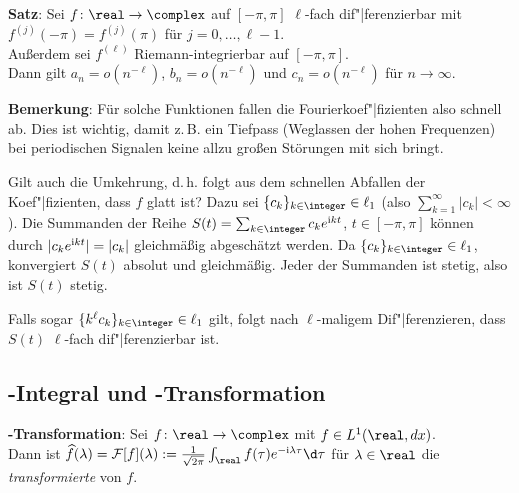 \linie

\textbf{Satz}:
Sei $f\colon \real \rightarrow \complex$ auf $[-\pi, \pi]$
$\ell$-fach dif"|ferenzierbar mit
$f^{(j)}(-\pi) = f^{(j)}(\pi)$ für $j = 0, \dotsc, \ell - 1$.\\
Außerdem sei $f^{(\ell)}$ Riemann-integrierbar auf $[-\pi, \pi]$.\\
Dann gilt $a_n = o(n^{-\ell})$,
$b_n = o(n^{-\ell})$ und
$c_n = o(n^{-\ell})$ für $n \to \infty$.

\textbf{Bemerkung}:
Für solche Funktionen fallen die Fourierkoef"|fizienten also schnell ab.
Dies ist wichtig, damit z.\,B. ein Tiefpass
(Weglassen der hohen Frequenzen) bei periodischen Signalen keine
allzu großen Störungen mit sich bringt.

\linie

Gilt auch die Umkehrung, d.\,h. folgt aus dem schnellen Abfallen der
Koef"|fizienten, dass $f$ glatt ist?
Dazu sei $\{c_k\}_{k \in \integer} \in \ell_1$
(also $\sum_{k=1}^\infty |c_k| < \infty$).
Die Summanden der Reihe $S(t) = \sum_{k \in \integer} c_k e^{\i kt}$,
$t \in [-\pi, \pi]$ können durch
$|c_k e^{\mathrm{i} k t}| = |c_k|$ gleichmäßig abgeschätzt werden.
Da $\{c_k\}_{k \in \integer} \in \ell_1$, konvergiert $S(t)$ absolut und
gleichmäßig.
Jeder der Summanden ist stetig,
also ist $S(t)$ stetig.

Falls sogar $\{k^\ell c_k\}_{k \in \integer} \in \ell_1$ gilt,
folgt nach $\ell$-maligem Dif"|ferenzieren, dass
$S(t)$ $\ell$-fach dif"|ferenzierbar ist.

\pagebreak

\subsection{%
    -Integral und -Transformation%
}

\textbf{-Transformation}:
Sei $f\colon \real \rightarrow \complex$ mit $f \in L^1(\real, dx)$.\\
Dann ist $\widehat{f}(\lambda) = \F[f](\lambda) :=
\frac{1}{\sqrt{2\pi}} \int_\real f(\tau) e^{-\i \lambda\tau} \d\tau$
für $\lambda \in \real$ die \emph{transformierte} von $f$.

